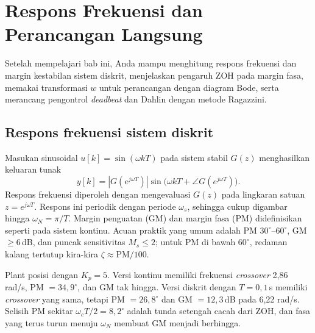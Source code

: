 \chapter{Respons Frekuensi dan Perancangan Langsung}
\label{bab:frek}

\begin{tujuan}
	Setelah mempelajari bab ini, Anda mampu menghitung respons frekuensi dan margin kestabilan sistem diskrit, menjelaskan pengaruh ZOH pada margin fasa, memakai transformasi $w$ untuk perancangan dengan diagram Bode, serta merancang pengontrol \textit{deadbeat} dan Dahlin dengan metode Ragazzini.
\end{tujuan}

\section{Respons frekuensi sistem diskrit}
Masukan sinusoidal $u[k] = \sin(\omega kT)$ pada sistem stabil $G(z)$ menghasilkan keluaran tunak
\begin{equation}
	y[k] = |G(e^{j\omega T})|\sin\big(\omega kT + \angle G(e^{j\omega T})\big).
\end{equation}
Respons frekuensi diperoleh dengan mengevaluasi $G(z)$ pada lingkaran satuan $z = e^{j\omega T}$. Respons ini periodik dengan periode $\omega_s$, sehingga cukup digambar hingga $\omega_N = \pi/T$. Margin penguatan (GM) dan margin fasa (PM) didefinisikan seperti pada sistem kontinu. Acuan praktik yang umum adalah PM $30^\circ$--$60^\circ$, GM $\ge 6$\,dB, dan puncak sensitivitas $M_s \le 2$; untuk PM di bawah $60^\circ$, redaman kalang tertutup kira-kira $\zeta \approx \text{PM}/100$.

\begin{contoh}
	Plant posisi dengan $K_p = 5$. Versi kontinu memiliki frekuensi \textit{crossover} 2,86 rad/s, PM $= 34{,}9^\circ$, dan GM tak hingga. Versi diskrit dengan $T = 0{,}1$\,s memiliki \textit{crossover} yang sama, tetapi PM $= 26{,}8^\circ$ dan GM $= 12{,}3$\,dB pada 6,22 rad/s. Selisih PM sekitar $\omega_cT/2 = 8{,}2^\circ$ adalah tunda setengah cacah dari ZOH, dan fasa yang terus turun menuju $\omega_N$ membuat GM menjadi berhingga.
\end{contoh}

